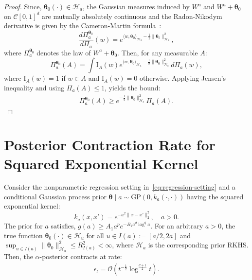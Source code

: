 \documentclass[final,12pt]{colt2026} %
\begin{document}
\begin{proof}
Since, $\pmb{\theta}_0(\cdot) \in \mathcal{H}_a$, the Gaussian measures induced by $W^{a}$ and $W^{a} + \pmb\theta_0$ on $\mathcal{C}[0, 1]^{d}$ are mutually absolutely continuous and the Radon-Nikodym derivative is given by the Cameron-Martin formula~\citep{cameron-martin}:
$$
\frac{d\Pi_a^{\pmb\theta_0}}{d\Pi_a}(w) = e^{\langle w, \pmb\theta_0\rangle_{\mathcal{H}_a} - \frac{1}{2}\lVert \pmb\theta_0\rVert_{\mathcal{H}_a}^{2}},
$$
where $\Pi_a^{\pmb\theta_0}$ denotes the law of $W^{a} + \pmb\theta_0$. Then, for any measurable $A$:
$$
\Pi_a^{\pmb\theta_0}(A) = \int \text{I}_A(w)e^{\langle w, \pmb\theta_0\rangle_{\mathcal{H}_a} - \frac{1}{2}\lVert \pmb\theta_0\rVert_{\mathcal{H}_a}^2}d\Pi_a(w),
$$
where $\text{I}_A(w) = 1$ if $w\in A$ and $\text{I}_A(w) = 0$ otherwise. Applying Jensen's inequality and using $\Pi_a(A) \leq 1$, yields the bound:
\begin{align*}
    \Pi_a^{\pmb\theta_0}(A) \geq e^{-\frac{1}{2}\lVert \pmb\theta_0\rVert^{2}_{\mathcal{H}_a}}\Pi_a(A).
\end{align*}
\end{proof}

\section{Posterior Contraction Rate for Squared Exponential Kernel}\label{app:SE-contraction}

\begin{lemma}
\label{lemma:SE-contraction-rate}
Consider the nonparametric regression setting in~\eqref{eq:regression-setting} and a conditional Gaussian process prior $\pmb\theta \mid a \sim \mathrm{GP}(0, k_a(\cdot, \cdot))$ having the squared exponential kernel:
$$k_a(x, x') = e^{-a^{2}\lVert x-x'\rVert_{2}^2}, \quad a>0.
$$ 
The prior for $a$ satisfies, $g(a) \geq A_1 a^{p}e^{-B_1 a^{d} \log^{q}a}$. For an arbitrary $a>0$, the true function $\pmb\theta_0(\cdot)\in \mathcal{H}_u$ for all $u\in I(a):= [a/2, 2a]$ and $\sup_{u\in I(a)}\lVert \pmb\theta_0\rVert_{\mathcal{H}_u}^{2} \leq R^{2}_{I(a)} < \infty$, where $\mathcal{H}_a$ is the corresponding prior RKHS. Then, the $\alpha$-posterior contracts at rate:
\begin{align*}
    \epsilon_t = \mathcal{O}\left(t^{-\frac{1}{2}}\log^{\frac{d+1}{2}}t\right).
\end{align*}
\end{lemma}
\end{document}
